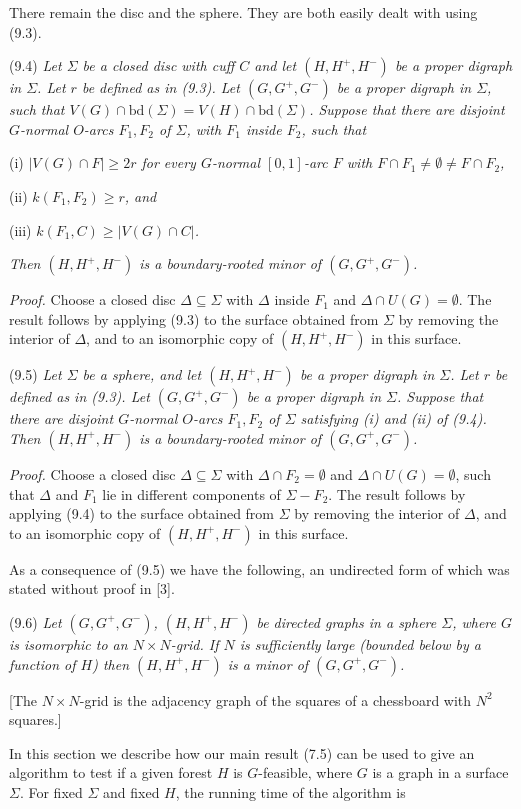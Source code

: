 There remain the disc and the sphere. They are both easily dealt with using (9.3).

\stmt
(9.4) \textit{Let $\Sigma$ be a closed disc with cuff $C$ and let $(H, H^+, H^-)$ be a proper digraph in $\Sigma$. Let $r$ be defined as in (9.3). Let $(G, G^+, G^-)$ be a proper digraph in $\Sigma$, such that $V(G) \cap \mathrm{bd}(\Sigma) = V(H) \cap \mathrm{bd}(\Sigma)$. Suppose that there are disjoint $G$-normal $O$-arcs $F_1, F_2$ of $\Sigma$, with $F_1$ inside $F_2$, such that}

\hspace*{12pt}(i) \textit{$|V(G) \cap F| \ge 2r$ for every $G$-normal $[0, 1]$-arc $F$ with $F \cap F_1 \ne \emptyset \ne F \cap F_2$,}

\hspace*{12pt}(ii) \textit{$k(F_1, F_2) \ge r$, and}

\hspace*{12pt}(iii) \textit{$k(F_1, C) \ge |V(G) \cap C|$.}

\textit{Then $(H, H^+, H^-)$ is a boundary-rooted minor of $(G, G^+, G^-)$.}

\textit{Proof.} Choose a closed disc $\Delta \subseteq \Sigma$ with $\Delta$ inside $F_1$ and $\Delta \cap U(G) = \emptyset$. The result follows by applying (9.3) to the surface obtained from $\Sigma$ by removing the interior of $\Delta$, and to an isomorphic copy of $(H, H^+, H^-)$ in this surface.

\stmt
(9.5) \textit{Let $\Sigma$ be a sphere, and let $(H, H^+, H^-)$ be a proper digraph in $\Sigma$. Let $r$ be defined as in (9.3). Let $(G, G^+, G^-)$ be a proper digraph in $\Sigma$. Suppose that there are disjoint $G$-normal $O$-arcs $F_1, F_2$ of $\Sigma$ satisfying (i) and (ii) of (9.4). Then $(H, H^+, H^-)$ is a boundary-rooted minor of $(G, G^+, G^-)$.}

\textit{Proof.} Choose a closed disc $\Delta \subseteq \Sigma$ with $\Delta \cap F_2 = \emptyset$ and $\Delta \cap U(G) = \emptyset$, such that $\Delta$ and $F_1$ lie in different components of $\Sigma - F_2$. The result follows by applying (9.4) to the surface obtained from $\Sigma$ by removing the interior of $\Delta$, and to an isomorphic copy of $(H, H^+, H^-)$ in this surface.

As a consequence of (9.5) we have the following, an undirected form of which was stated without proof in [3].

\stmt
(9.6) \textit{Let $(G, G^+, G^-)$, $(H, H^+, H^-)$ be directed graphs in a sphere $\Sigma$, where $G$ is isomorphic to an $N \times N$-grid. If $N$ is sufficiently large (bounded below by a function of $H$) then $(H, H^+, H^-)$ is a minor of $(G, G^+, G^-)$.}

[The $N \times N$-grid is the adjacency graph of the squares of a chessboard with $N^2$ squares.]


In this section we describe how our main result (7.5) can be used to give an algorithm to test if a given forest $H$ is $G$-feasible, where $G$ is a graph in a surface $\Sigma$. For fixed $\Sigma$ and fixed $H$, the running time of the algorithm is
